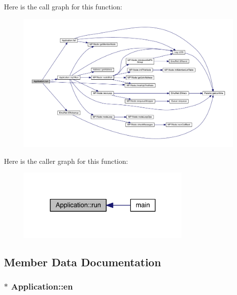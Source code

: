 Here is the call graph for this function\+:\nopagebreak
\begin{figure}[H]
\begin{center}
\leavevmode
\includegraphics[width=350pt]{de/d6b/class_application_a8cf8941c8db90117d3735bce5ae1fdf4_cgraph}
\end{center}
\end{figure}




Here is the caller graph for this function\+:\nopagebreak
\begin{figure}[H]
\begin{center}
\leavevmode
\includegraphics[width=240pt]{de/d6b/class_application_a8cf8941c8db90117d3735bce5ae1fdf4_icgraph}
\end{center}
\end{figure}




\subsection{Member Data Documentation}
\hypertarget{class_application_a96273af089eddb43c743f6386ca3938c}{}
\subsubsection[{en}]{$\ast$ Application\+::en\hspace{0.3cm}{\ttfamily [private]}}\label{class_application_a96273af089eddb43c743f6386ca3938c}
\hypertarget{class_application_acca96da4be60c3bc3018337cc6233e46}{}
